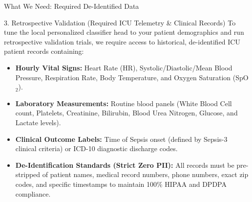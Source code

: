 \documentclass[aspectratio=169, 11pt]{beamer}
\begin{document}
\begin{frame}{What We Need: Required De-Identified Data}
    \begin{block}{3. Retrospective Validation (Required ICU Telemetry \& Clinical Records)}
        \scriptsize
        To tune the local personalized classifier head to your patient demographics and run retrospective validation trials, we require access to historical, de-identified ICU patient records containing:
        \begin{itemize}
            \scriptsize
            \item \textbf{Hourly Vital Signs:} Heart Rate (HR), Systolic/Diastolic/Mean Blood Pressure, Respiration Rate, Body Temperature, and Oxygen Saturation (SpO$_2$).
            \item \textbf{Laboratory Measurements:} Routine blood panels (White Blood Cell count, Platelets, Creatinine, Bilirubin, Blood Urea Nitrogen, Glucose, and Lactate levels).
            \item \textbf{Clinical Outcome Labels:} Time of Sepsis onset (defined by Sepsis-3 clinical criteria) or ICD-10 diagnostic discharge codes.
            \item \textbf{De-Identification Standards (Strict Zero PII):} All records must be pre-stripped of patient names, medical record numbers, phone numbers, exact zip codes, and specific timestamps to maintain 100\% HIPAA and DPDPA compliance.
        \end{itemize}
    \end{block}
\end{frame}
\end{document}
